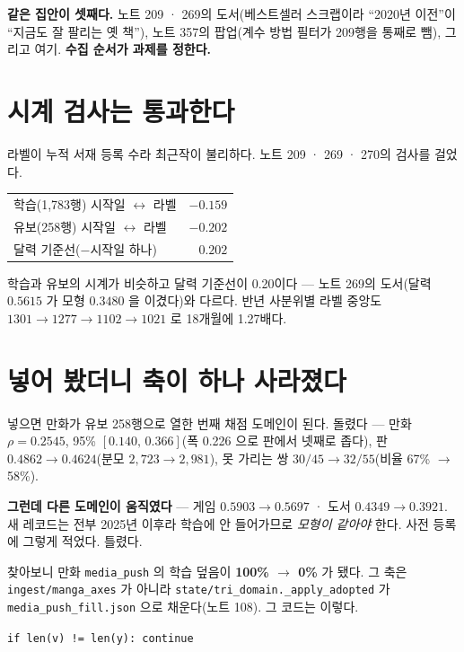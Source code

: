 \documentclass[11pt]{article}
\begin{document}
\textbf{같은 집안이 셋째다.} 노트 209 · 269의 도서(베스트셀러 스크랩이라
``2020년 이전''이 ``지금도 잘 팔리는 옛 책''), 노트 357의 팝업(계수 방법
필터가 209행을 통째로 뺌), 그리고 여기. \textbf{수집 순서가 과제를 정한다.}

\section{시계 검사는 통과한다}

라벨이 누적 서재 등록 수라 최근작이 불리하다. 노트 209 · 269 · 270의
검사를 걸었다.

\begin{center}
\begin{tabular}{lr}
\hline
학습(1,783행) 시작일 $\leftrightarrow$ 라벨 & $-0.159$ \\
유보(258행) 시작일 $\leftrightarrow$ 라벨   & $-0.202$ \\
달력 기준선($-$시작일 하나) & $\mathbf{0.202}$ \\
\hline
\end{tabular}
\end{center}

학습과 유보의 시계가 비슷하고 달력 기준선이 0.20이다 --- 노트 269의
도서(달력 $0.5615$ 가 모형 $0.3480$ 을 이겼다)와 다르다. 반년 사분위별
라벨 중앙도 $1301 \to 1277 \to 1102 \to 1021$ 로 18개월에 1.27배다.

\section{넣어 봤더니 축이 하나 사라졌다}

넣으면 만화가 유보 258행으로 열한 번째 채점 도메인이 된다. 돌렸다 ---
만화 $\rho = 0.2545$, 95\% $[0.140,\,0.366]$(폭 0.226 으로 판에서 넷째로
좁다), 판 $0.4862 \to 0.4624$(분모 $2{,}723 \to 2{,}981$), 못 가리는 쌍
$30/45 \to 32/55$(비율 67\% $\to$ 58\%).

\textbf{그런데 다른 도메인이 움직였다} --- 게임 $0.5903 \to 0.5697$ ·
도서 $0.4349 \to 0.3921$. 새 레코드는 전부 2025년 이후라 학습에 안
들어가므로 \emph{모형이 같아야} 한다. 사전 등록에 그렇게 적었다. 틀렸다.

찾아보니 만화 \texttt{media\_push} 의 학습 덮음이 \textbf{100\% $\to$ 0\%}
가 됐다. 그 축은 \texttt{ingest/manga\_axes} 가 아니라
\texttt{state/tri\_domain.\_apply\_adopted} 가 \texttt{media\_push\_fill.json}
으로 채운다(노트 108). 그 코드는 이렇다.

\begin{center}
\texttt{if len(v) != len(y): continue}
\end{center}
\end{document}
